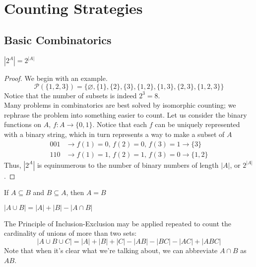\section{Counting Strategies}
\subsection{Basic Combinatorics}
\begin{theorem}
$|2^A|=2^{|A|}$
\end{theorem}
\begin{proof} 
We begin with an example.
$$\mathcal{P}(\{1, 2, 3\}) = \{\varnothing, \{1\}, \{2\}, \{3\}, \{1, 2\}, \{1, 3\}, \{2, 3\}, \{1, 2, 3\}\}$$
Notice that the number of subsets is indeed $2^3 = 8$. \\
Many problems in combinatorics are best solved by isomorphic counting; we rephrase the problem into something easier to count. Let us consider the binary functions on $A$,  $f: A \rightarrow \{0, 1\}$. Notice that each $f$ can be uniquely represented with a binary string, which in turn represents a way to make a subset of $A$
\begin{align*}
    001 &\rightarrow f(1) = 0,\, f(2) = 0,\, f(3) = 1 \rightarrow \{3\}\\
    110 &\rightarrow f(1) = 1,\, f(2) = 1,\, f(3) = 0 \rightarrow \{1, 2\}
\end{align*}
Thus, $|2^A|$ is equinumerous to the number of binary numbers of length $|A|$, or $2^{|A|}$.
\end{proof}

\begin{theorem}
If $A \subseteq B$ and $B \subseteq A$, then $A = B$
\end{theorem}
\begin{theorem}
$|A\cup B| = |A| + |B| - |A \cap B|$
\end{theorem}
The Principle of Inclusion-Exclusion may be applied repeated to count the cardinality of unions of more than two sets:
$$|A\cup B\cup C| = |A| + |B| + |C| - |AB| - |BC| - |AC| + |ABC|$$
Note that when it's clear what we're talking about, we can abbreviate $A\cap B$ as $AB$.

